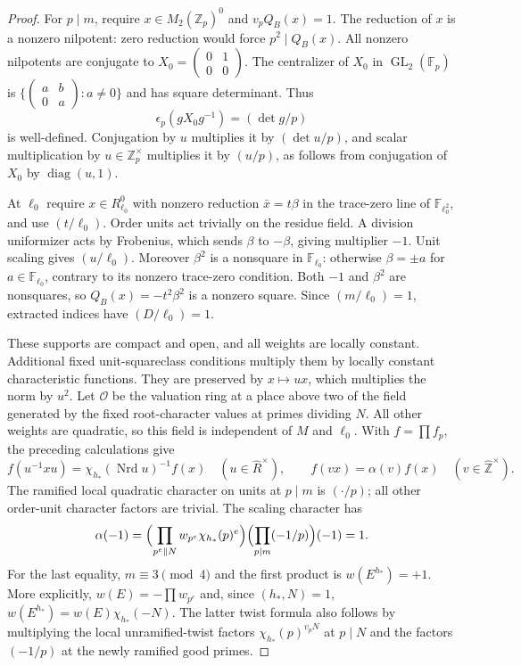 \documentclass[11pt]{article}
\theoremstyle{definition}
\theoremstyle{remark}
\begin{document}
\begin{proof}
For $p\mid m$, require $x\in M_2(\mathbb Z_p)^0$ and $v_pQ_B(x)=1$.
The reduction of $x$ is a nonzero nilpotent: zero reduction would
force $p^2\mid Q_B(x)$.  All nonzero nilpotents are conjugate to
$X_0=\left(\begin{smallmatrix}0&1\\0&0\end{smallmatrix}\right)$.
The centralizer of $X_0$ in $\operatorname{GL}_2(\mathbb F_p)$ is
$\{\left(\begin{smallmatrix}a&b\\0&a\end{smallmatrix}\right):a\ne0\}$
and has square determinant.  Thus
\[
 \epsilon_p(gX_0g^{-1})=(\det g/p)
\]
is well-defined.  Conjugation by $u$ multiplies it by $(\det u/p)$,
and scalar multiplication by $u\in\mathbb Z_p^\times$ multiplies
it by $(u/p)$, as follows from conjugation of $X_0$ by
$\operatorname{diag}(u,1)$.

At $\ell_0$ require $x\in R_{\ell_0}^0$ with nonzero reduction
$\bar x=t\beta$ in the trace-zero line of $\mathbb F_{\ell_0^2}$,
and use $(t/\ell_0)$.  Order units act trivially on the residue
field.  A division uniformizer acts by Frobenius, which sends
$\beta$ to $-\beta$, giving multiplier $-1$.
Unit scaling gives $(u/\ell_0)$.  Moreover $\beta^2$ is a nonsquare
in $\mathbb F_{\ell_0}$: otherwise $\beta=\pm a$ for
$a\in\mathbb F_{\ell_0}$, contrary to its nonzero trace-zero condition.
Both $-1$ and $\beta^2$ are nonsquares, so $Q_B(x)=-t^2\beta^2$
is a nonzero square.  Since $(m/\ell_0)=1$, extracted indices have
$(D/\ell_0)=1$.

These supports are compact and open, and all weights are locally
constant.  Additional fixed unit-squareclass conditions multiply
them by locally constant characteristic functions.  They are
preserved by $x\mapsto ux$, which multiplies the norm by $u^2$.
Let $\mathcal O$ be the valuation ring at a place above two of the
field generated by the fixed root-character values at primes
dividing $N$.  All other weights are quadratic, so this field is
independent of $M$ and $\ell_0$.
With $f=\prod f_p$, the preceding calculations give
\[
 f(u^{-1}xu)=\chi_{h_*}(\operatorname{Nrd}u)^{-1}f(x)
       \quad (u\in\widehat R^\times),
 \qquad f(vx)=\alpha(v)f(x)\quad(v\in\widehat{\mathbb Z}^{\times}).
\]
The ramified local quadratic character on units at $p\mid m$ is
$(\cdot/p)$; all other order-unit character factors are trivial.
The scaling character has
\[
 \alpha(-1)=
 \Bigl(\prod_{p^e\Vert N}w_{p^e}\chi_{h_*}(p)^e\Bigr)
             \Bigl(\prod_{p\mid m}(-1/p)\Bigr)(-1)=1.
\]
For the last equality, $m\equiv3\pmod4$ and the first product is
$w(E^{h_*})=+1$.  More explicitly,
$w(E)=-\prod w_{p^e}$ and, since $(h_*,N)=1$,
$w(E^{h_*})=w(E)\chi_{h_*}(-N)$.
The latter twist formula also follows by multiplying the local
unramified-twist factors $\chi_{h_*}(p)^{v_pN}$ at $p\mid N$
and the factors $(-1/p)$ at the newly ramified good primes.


\end{proof}
\end{document}
